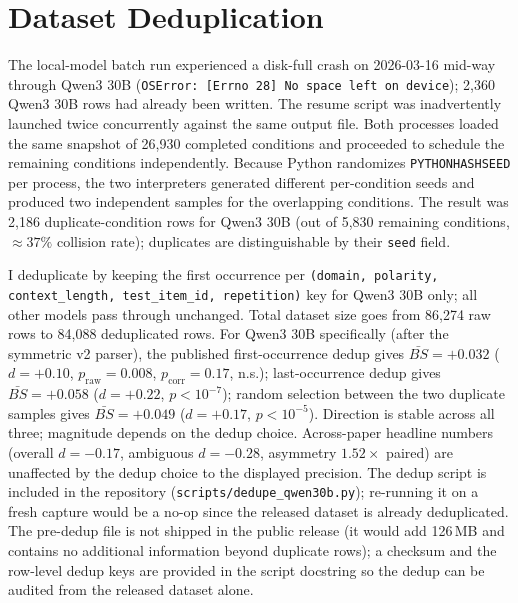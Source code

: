 \documentclass[10pt,twocolumn]{article}
\begin{document}
\section{Dataset Deduplication}
\label{app:dedup}

The local-model batch run experienced a disk-full crash on 2026-03-16 mid-way through Qwen3 30B (\texttt{OSError: [Errno 28] No space left on device}); 2,360 Qwen3 30B rows had already been written.
The resume script was inadvertently launched twice concurrently against the same output file.
Both processes loaded the same snapshot of 26,930 completed conditions and proceeded to schedule the remaining conditions independently.
Because Python randomizes \texttt{PYTHONHASHSEED} per process, the two interpreters generated different per-condition seeds and produced two independent samples for the overlapping conditions.
The result was 2,186 duplicate-condition rows for Qwen3 30B (out of 5,830 remaining conditions, $\approx 37\%$ collision rate); duplicates are distinguishable by their \texttt{seed} field.

I deduplicate by keeping the first occurrence per \texttt{(domain, polarity, context\_length, test\_item\_id, repetition)} key for Qwen3 30B only; all other models pass through unchanged.
Total dataset size goes from 86,274 raw rows to 84,088 deduplicated rows.
For Qwen3 30B specifically (after the symmetric v2 parser), the published first-occurrence dedup gives $\bar{BS} = +0.032$ ($d = +0.10$, $p_\text{raw} = 0.008$, $p_\text{corr} = 0.17$, n.s.); last-occurrence dedup gives $\bar{BS} = +0.058$ ($d = +0.22$, $p < 10^{-7}$); random selection between the two duplicate samples gives $\bar{BS} = +0.049$ ($d = +0.17$, $p < 10^{-5}$). Direction is stable across all three; magnitude depends on the dedup choice.
Across-paper headline numbers (overall $d = -0.17$, ambiguous $d = -0.28$, asymmetry $1.52\times$ paired) are unaffected by the dedup choice to the displayed precision.
The dedup script is included in the repository (\texttt{scripts/dedupe\_qwen30b.py}); re-running it on a fresh capture would be a no-op since the released dataset is already deduplicated.
The pre-dedup file is not shipped in the public release (it would add 126\,MB and contains no additional information beyond duplicate rows); a checksum and the row-level dedup keys are provided in the script docstring so the dedup can be audited from the released dataset alone.
\end{document}
